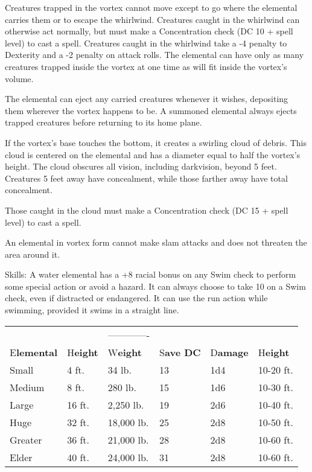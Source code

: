 \documentclass{article}
\begin{document}
Creatures trapped in the vortex cannot move except to go where the elemental carries 
them or to escape the whirlwind. Creatures caught in the whirlwind can otherwise 
act normally, but must make a Concentration check (DC 10 + spell level) to cast 
a spell. Creatures caught in the whirlwind take a -4 penalty to Dexterity and a 
-2 penalty on attack rolls. The elemental can have only as many creatures trapped 
inside the vortex at one time as will fit inside the vortex's volume.

The elemental can eject any carried creatures whenever it wishes, depositing them 
wherever the vortex happens to be. A summoned elemental always ejects trapped creatures 
before returning to its home plane.

If the vortex's base touches the bottom, it creates a swirling cloud of debris. 
This cloud is centered on the elemental and has a diameter equal to half the vortex's 
height. The cloud obscures all vision, including darkvision, beyond 5 feet. Creatures 
5 feet away have concealment, while those farther away have total concealment.

Those caught in the cloud must make a Concentration check (DC 15 + spell level) 
to cast a spell.

An elemental in vortex form cannot make slam attacks and does not threaten the 
area around it. 

Skills: A water elemental has a +8 racial bonus on any Swim check to perform some 
special action or avoid a hazard. It can always choose to take 10 on a Swim check, 
even if distracted or endangered. It can use the run action while swimming, provided 
it swims in a straight line.

\begin{tabular}{|>{\raggedright}p{42pt}|>{\raggedright}p{27pt}|>{\raggedright}p{39pt}|>{\raggedright}p{37pt}|>{\raggedright}p{35pt}|>{\raggedright}p{36pt}|}
\hline
\multicolumn{6}{|p{218pt}|}{W\textbf{ater Elemental Sizes}}\tabularnewline
\hline
 &  & ------------- & \multicolumn{3}{p{109pt}|}{ \textbf{Vortex -------------}}\tabularnewline
\hline
E\textbf{lemental} & H\textbf{eight} & W\textbf{eight} & S\textbf{ave DC} & D\textbf{amage} & H\textbf{eight}\tabularnewline
\hline
Small & 4 ft. & 34 lb. & 13 & 1d4 & 10-20 ft.\tabularnewline
\hline
Medium & 8 ft. & 280 lb. & 15 & 1d6 & 10-30 ft.\tabularnewline
\hline
Large & 16 ft. & 2,250 lb. & 19 & 2d6 & 10-40 ft.\tabularnewline
\hline
Huge & 32 ft. & 18,000 lb. & 25 & 2d8 & 10-50 ft.\tabularnewline
\hline
Greater & 36 ft. & 21,000 lb. & 28 & 2d8 & 10-60 ft.\tabularnewline
\hline
Elder & 40 ft. & 24,000 lb. & 31 & 2d8 & 10-60 ft.\tabularnewline
\hline
\end{tabular}
\end{document}
